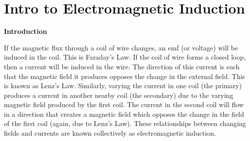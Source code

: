 \section{Intro to Electromagnetic Induction}
\label{induction_intro}

\makelabheader %



\bigskip

\textbf{Introduction} 

If the magnetic flux through a coil of wire changes, an emf (or voltage) 
will be induced in the coil. This is Faraday's Law. If the coil of wire 
forms a closed loop, then a current will be induced in the wire. The direction 
of this current is such that the magnetic field it produces opposes the change 
in the external field. This is known as Lenz's Law. Similarly, varying the 
current in one coil (the primary) produces a current in another nearby coil 
(the secondary) due to the varying magnetic field produced by the first coil. 
The current in the second coil will flow in a direction that creates a magnetic
field which opposes the change in the field of the first coil (again, due to 
Lenz's Law). These relationships between changing fields and currents are known 
collectively as electromagnetic induction.

\bigskip

